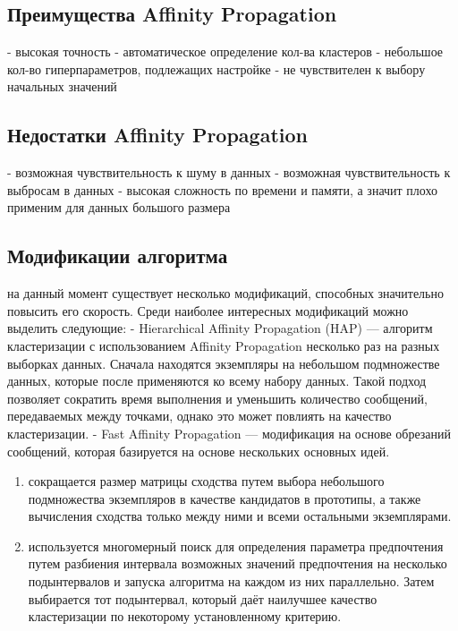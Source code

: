 \subsection{Преимущества Affinity Propagation}
- высокая точность
\newline
- автоматическое определение кол-ва кластеров
\newline
- небольшое кол-во гиперпараметров, подлежащих настройке
\newline
- не чувствителен к выбору начальных значений

\subsection{Недостатки Affinity Propagation}
- возможная чувствительность к шуму в данных
- возможная чувствительность к выбросам в данных
\newline
- высокая сложность по времени и памяти, а значит плохо применим для данных большого размера

\subsection{Модификации алгоритма}

на данный момент существует несколько модификаций, способных значительно повысить его скорость. Среди наиболее интересных модификаций можно выделить следующие:
\newline
\newline
- Hierarchical Affinity Propagation (HAP) — алгоритм кластеризации с использованием Affinity Propagation несколько раз на разных выборках данных. Сначала находятся экземпляры на небольшом подмножестве данных, которые после применяются ко всему набору данных. Такой подход позволяет сократить время выполнения и уменьшить количество сообщений, передаваемых между точками, однако это может повлиять на качество кластеризации.
\newline
\newline
 - Fast Affinity Propagation — модификация на основе обрезаний сообщений, которая базируется на основе нескольких основных идей. 
 \begin{enumerate}
     \item сокращается размер матрицы сходства путем выбора небольшого подмножества экземпляров в качестве кандидатов в прототипы, а также вычисления сходства только между ними и всеми остальными экземплярами.

     \item используется многомерный поиск для определения параметра предпочтения путем разбиения интервала возможных значений предпочтения на несколько подынтервалов и запуска алгоритма на каждом из них параллельно. Затем выбирается тот подынтервал, который даёт наилучшее качество кластеризации по некоторому установленному критерию.

 \end{enumerate} 
 
